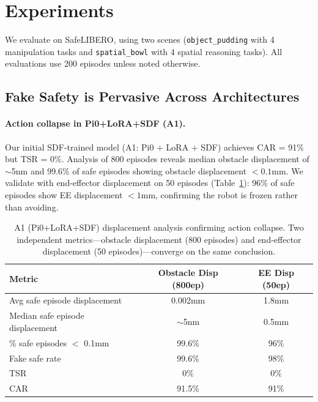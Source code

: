 \documentclass[letterpaper]{article}
\begin{document}
\section{Experiments}
\label{sec:experiments}

We evaluate on SafeLIBERO, using two scenes (\texttt{object\_pudding} with 4 manipulation tasks and \texttt{spatial\_bowl} with 4 spatial reasoning tasks). All evaluations use 200 episodes unless noted otherwise.

\subsection{Fake Safety is Pervasive Across Architectures}
\label{sec:fake_safety}

\paragraph{Action collapse in Pi0+LoRA+SDF (A1).}
Our initial SDF-trained model (A1: Pi0 + LoRA + SDF) achieves CAR = 91\% but TSR = 0\%. Analysis of 800 episodes reveals median obstacle displacement of $\sim$5nm and 99.6\% of safe episodes showing obstacle displacement $< 0.1$mm. We validate with end-effector displacement on 50 episodes (Table~\ref{tab:a1_ee}): 96\% of safe episodes show EE displacement $< 1$mm, confirming the robot is frozen rather than avoiding.

\begin{table}[h]
\centering
\caption{A1 (Pi0+LoRA+SDF) displacement analysis confirming action collapse. Two independent metrics---obstacle displacement (800 episodes) and end-effector displacement (50 episodes)---converge on the same conclusion.}
\label{tab:a1_ee}
\begin{tabular}{lcc}
\toprule
\textbf{Metric} & \textbf{Obstacle Disp (800ep)} & \textbf{EE Disp (50ep)} \\
\midrule
Avg safe episode displacement & 0.002mm & 1.8mm \\
Median safe episode displacement & $\sim$5nm & 0.5mm \\
\% safe episodes $<$ 0.1mm & 99.6\% & 96\% \\
Fake safe rate & 99.6\% & 98\% \\
TSR & 0\% & 0\% \\
CAR & 91.5\% & 91\% \\
\bottomrule
\end{tabular}
\end{table}
\end{document}

